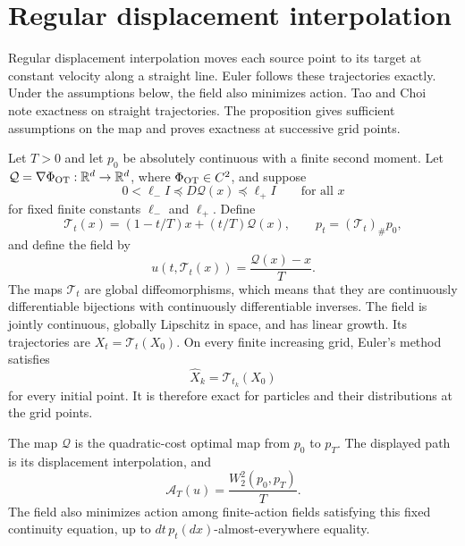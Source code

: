 \section{Regular displacement interpolation}
\label{app:displacement}


Regular displacement interpolation moves each source point to its target at constant velocity along a straight line. Euler follows these trajectories exactly. Under the assumptions below, the field also minimizes action. Tao and Choi~\citep[Remark~7]{tao2026strain} note exactness on straight trajectories. The proposition gives sufficient assumptions on the map and proves exactness at successive grid points.

\begin{proposition}
\label{prop:displacement-euler}
Let $T>0$ and let $p_0$ be absolutely continuous with a finite second moment.
Let $\mathcal Q=\nabla\Phi_{\rm OT}:\mathbb R^d\to\mathbb R^d$, where
$\Phi_{\rm OT}\in C^2$, and suppose
\[
 0<\ell_- I\preceq D\mathcal Q(x)\preceq\ell_+ I
 \qquad\text{for all }x
\]
for fixed finite constants $\ell_-$ and $\ell_+$.
Define
\[
 \mathcal T_t(x)=(1-t/T)x+(t/T)\mathcal Q(x),\qquad
 p_t=(\mathcal T_t)_\#p_0,
\]
and define the field by
\[
 u(t,\mathcal T_t(x))=\frac{\mathcal Q(x)-x}{T}.
\]
The maps $\mathcal T_t$ are global diffeomorphisms, which means that they are continuously differentiable bijections with continuously differentiable inverses. The field is jointly continuous,
globally Lipschitz in space, and has linear growth. Its trajectories are
$X_t=\mathcal T_t(X_0)$.
On every finite increasing grid, Euler's method satisfies
\[
 \widehat X_k=\mathcal T_{t_k}(X_0)
\]
for every initial point. It is therefore exact for particles and their distributions at the grid points.

The map $\mathcal Q$ is the quadratic-cost optimal map from $p_0$ to
$p_T$. The displayed path is its displacement interpolation, and
\[
 \mathcal A_T(u)=\frac{W_2^2(p_0,p_T)}{T}.
\]
The field also minimizes action among finite-action fields satisfying this
fixed continuity equation, up to $dt\,p_t(dx)$-almost-everywhere equality.
\end{proposition}

